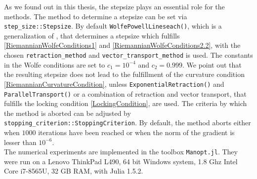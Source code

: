 As we found out in this thesis, the stepsize plays an essential role for the methods. The method to determine a stepsize can be set via \lstinline!step_size::Stepsize!. By default \lstinline!WolfePowellLineseach()!, which is a generalization of \cite[Algorithmus~9.3]{UlbrichUlbrich:2012}, that determines a stepsize which fulfills \cref{RiemannianWolfeConditions1} and \cref{RiemannianWolfeConditions2.2}, with the chosen \lstinline!retraction_method! and \lstinline!vector_transport_method! is used. The constants in the Wolfe conditions are set to $c_1 = 10^{−4}$ and $c_2 = 0.999$. We point out that the resulting stepsize does not lead to the fulfillment of the curvature condition \cref{RiemannianCurvatureCondition}, unless \lstinline!ExponentialRetraction()! and \lstinline!ParallelTransport()! or a combination of retraction and vector transport, that fulfills the locking condition \cref{LockingCondition}, are used. The criteria by which the method is aborted can be adjusted by \lstinline!stopping_criterion::StoppingCriterion!. By default, the method aborts either when $1000$ iterations have been reached or when the norm of the gradient is lesser than $10^{-6}$. \\
The numerical experiments are implemented in the toolbox \lstinline!Manopt.jl!. They were run on a Lenovo ThinkPad L490, 64 bit Windows system, 1.8 Ghz Intel Core i7-8565U, 32 GB RAM, with Julia 1.5.2.



